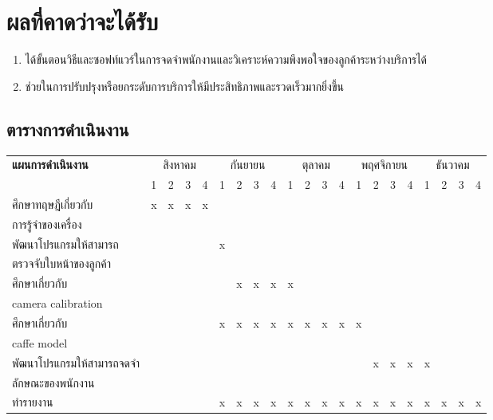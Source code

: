 \section{ผลที่คาดว่าจะได้รับ}
\begin{enumerate}[label=1.5.\arabic*]
\item{ได้ขั้นตอนวิธีและซอฟท์แวร์ในการจดจำพนักงานและวิเคราะห์ความพึงพอใจของลูกค้าระหว่างบริการได้}
\item{ช่วยในการปรับปรุงหรือยกระดับการบริการให้มีประสิทธิภาพและรวดเร็วมากยิ่งขึ้น}
\end{enumerate}
\newpage
\begin{landscape}
\section{ตารางการดำเนินงาน}
\begin{table}[h!]
 \centering
  \begin{tabular}{|l|c|c|c|c|c|c|c|c|c|c|c|c|c|c|c|c|c|c|c|c|}
  
    \hline
    \multirow{2}{*}{\textbf{แผนการดำเนินงาน}}
    & \multicolumn{4}{c|}{สิงหาคม} 
    & \multicolumn{4}{c|}{กันยายน} 
    & \multicolumn{4}{c|}{ตุลาคม}
    & \multicolumn{4}{c|}{พฤศจิกายน}
    & \multicolumn{4}{c|}{ธันวาคม}\\
    \cline{2-21}
    & 1 & 2 & 3 & 4
    & 1 & 2 & 3 & 4
    & 1 & 2 & 3 & 4
    & 1 & 2 & 3 & 4
    & 1 & 2 & 3 & 4\\
    \hline
    
    ศึกษาทฤษฎีเกี่ยวกับ &x&x&x&x&&&&&&&&&&&&&&&& \\
    การรู้จำของเครื่อง  &&&&&&&&&&&&&&&&&&&&\\
    \hline
    พัฒนาโปรแกรมให้สามารถ  &&&&&x&&&&&&&&&&&&&&&\\
    ตรวจจับใบหน้าของลูกค้า &&&&&&&&&&&&&&&&&&&&\\
     \hline
     ศึกษาเกี่ยวกับ  &&&&&&x&x&x&x&&&&&&&&&&&\\
     camera calibration &&&&&&&&&&&&&&&&&&&&\\
    \hline
    ศึกษาเกี่ยวกับ &&&&&x&x&x&x&x&x&x&x&x&&&&&&&\\
    caffe model &&&&&&&&&&&&&&&&&&&&\\
    \hline
    พัฒนาโปรแกรมให้สามารถจดจำ  &&&&&&&&&&&&&&x&x&x&x&&&\\
    ลักษณะของพนักงาน  &&&&&&&&&&&&&&&&&&&&\\
    \hline
    ทำรายงาน &&&&&x&x&x&x&x&x&x&x&x&x&x&x&x&x&x&x\\
    \hline
    

\end{tabular}
\end{table}
\end{landscape}
